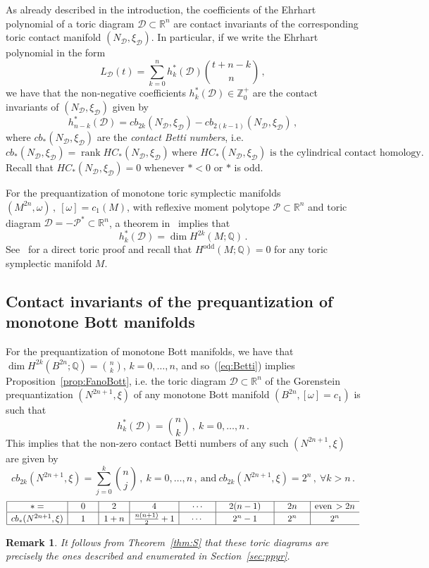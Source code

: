 \documentclass[a4paper,11pt,reqno]{amsart}
\newcommand{\R}{\mathbb R}
\newcommand{\Q}{\mathbb Q}
\newcommand{\Z}{\mathbb Z}
\newcommand{\Dd}{{\mathcal D}}
\newcommand{\Pp}{{\mathcal P}}
\DeclareMathOperator{\rank}{rank}
\newtheorem{remark}[theorem]{Remark}
\begin{document}
As already described in the introduction, the coefficients of the Ehrhart polynomial of a toric diagram $\Dd\subset\R^n$
are contact invariants of the corresponding toric contact manifold $(N_{\Dd}, \xi_{\Dd})$. In particular, if we write the Ehrhart
polynomial in the form
\[
L_{\Dd} (t) = \sum_{k=0}^n h^\ast_k (\Dd) \binom{t+n-k}{n}\,,
\]
we have that the non-negative coefficients $h^\ast_k (\Dd) \in \Z^+_0$ are the contact invariants of $(N_{\Dd}, \xi_{\Dd})$ 
given by
\[
h^\ast_{n-k} (\Dd) = cb_{2k} (N_{\Dd}, \xi_{\Dd}) - cb_{2(k-1)} (N_{\Dd}, \xi_{\Dd})\,,
\]
where $cb_{\ast} (N_{\Dd}, \xi_{\Dd})$ are the \emph{contact Betti numbers}, i.e.
\[
cb_{\ast} (N_{\Dd}, \xi_{\Dd}) = \rank HC_\ast (N_\Dd, \xi_\Dd) \ \text{where  $HC_\ast (N_\Dd, \xi_\Dd)$ 
is the cylindrical contact homology.}
\] 
Recall that $HC_\ast (N_\Dd, \xi_\Dd) = 0$ whenever $\ast <0$ or $\ast$ is odd.

For the prequantization of monotone toric symplectic manifolds $(M^{2n}, \omega)\,,\ [\omega]=c_1(M)$, with reflexive 
moment polytope $\Pp \subset \R^n$ and toric diagram $\Dd= -\Pp^\ast \subset \R^n$, a theorem in~\cite{B} implies 
that 
\begin{equation} \label{eq:Betti}
h^\ast_k (\Dd) = \dim H^{2k} (M;\Q) \,.
\end{equation}
See~\cite{AMM} for a direct toric proof and recall that $H^{\text{odd}} (M; \Q) = 0$ for any toric symplectic manifold $M$.

\subsection{Contact invariants of the prequantization of monotone Bott manifolds}
\label{ssec:preqFanoBott}

For the prequantization of monotone Bott manifolds, we have that $\dim H^{2k} (B^{2n}; \Q) = \binom{n}{k}$,
$k=0,\ldots,n$, and so~(\ref{eq:Betti}) implies Proposition~\ref{prop:FanoBott}, i.e. the toric diagram $\Dd\subset\R^n$
of the Gorenstein prequantization $(N^{2n+1}, \xi)$ of any monotone Bott manifold $(B^{2n}, [\omega] = c_1)$ is such that
\[
h^\ast_k (\Dd) = \binom{n}{k}\,,\ k=0,\ldots,n\,.
\]
This implies that the non-zero contact Betti numbers of any such $(N^{2n+1}, \xi)$ are given by
\[
cb_{2k} (N^{2n+1}, \xi) = \sum_{j=0}^k  \binom{n}{j}\,,\ k=0, \ldots, n\,, \ \text{and} \ cb_{2k} (N^{2n+1}, \xi) = 2^n\,,\ \forall k>n\,.
\]
\begin{equation*}
\begin{array}{|c|c|c|c|c|c|c|cl} \hline
  \ast =  & \quad   0 \quad  & \quad 2 \quad & \quad 4 \quad & \quad \cdots \quad & \quad 2(n-1) \quad & \quad 2n \quad & \text{even}\, > 2n
\\ 
\hline 
cb_\ast (N^{2n+1},\xi) &   1   & 1+n & \frac{n(n+1)}{2} +1 & \cdots & 2^n -1 & 2^n &  2^n
\\
\hline
\end{array}
\end{equation*}
\begin{remark} 
It follows from Theorem~\ref{thm:S} that these toric diagrams are precisely the ones described and enumerated in 
Section~\ref{sec:ppyr}.
\end{remark}
\end{document}
